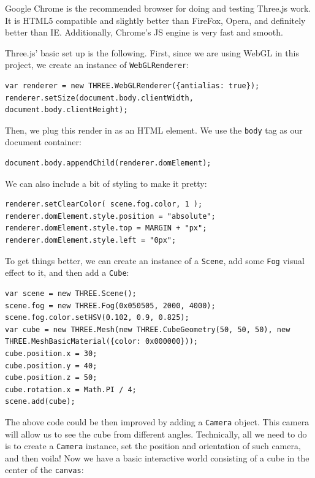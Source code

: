 Google Chrome is the recommended browser for doing and testing Three.js work. It is HTML5 compatible and slightly better than FireFox, Opera, and definitely better than IE. Additionally, Chrome’s JS engine is very fast and smooth.


Three.js' basic set up is the following. First, since we are using WebGL in this project, we create an instance of \texttt{WebGLRenderer}:

\begin{lstlisting}
var renderer = new THREE.WebGLRenderer({antialias: true});
renderer.setSize(document.body.clientWidth, document.body.clientHeight);
\end{lstlisting}

Then, we plug this render in as an HTML element. We use the \texttt{body} tag as our document container:

\begin{lstlisting}
document.body.appendChild(renderer.domElement);
\end{lstlisting}

We can also include a bit of styling to make it pretty:

\begin{lstlisting}
renderer.setClearColor( scene.fog.color, 1 );
renderer.domElement.style.position = "absolute";
renderer.domElement.style.top = MARGIN + "px";
renderer.domElement.style.left = "0px";
\end{lstlisting}

To get things better, we can create an instance of a \texttt{Scene}, add some \texttt{Fog} visual effect to it, and then add a \texttt{Cube}: 

\begin{lstlisting}
var scene = new THREE.Scene();
scene.fog = new THREE.Fog(0x050505, 2000, 4000);
scene.fog.color.setHSV(0.102, 0.9, 0.825);
var cube = new THREE.Mesh(new THREE.CubeGeometry(50, 50, 50), new THREE.MeshBasicMaterial({color: 0x000000}));
cube.position.x = 30;
cube.position.y = 40;
cube.position.z = 50;
cube.rotation.x = Math.PI / 4;
scene.add(cube);
\end{lstlisting}

The above code could be then improved by adding a \texttt{Camera} object. This camera will allow us to see the cube from different angles. Technically, all we need to do is to create a \texttt{Camera} instance, set the position and orientation of such camera, and then voila! Now we have a basic interactive world consisting of a cube in the center of the \texttt{canvas}:

